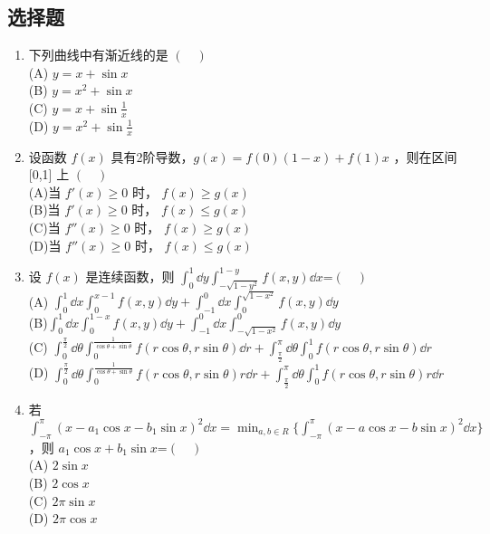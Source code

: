 
\subsection{选择题}
\begin{enumerate}
\item 下列曲线中有渐近线的是 $(\quad)$\\
(A) $y=x+\sin x$\\
(B) $y=x^2+\sin x$\\
(C) $y=x+\sin \frac{1}{x}$\\
(D) $y=x^2+\sin \frac{1}{x}$
\item  设函数 $f(x)$ 具有2阶导数，$g(x)=f(0)(1-x)+f(1)x$  ，则在区间  [0,1] 上 $(\quad)$\\
(A)当 $f'(x) \ge 0$ 时， $f(x)\ge g(x)$\\
(B)当 $f'(x) \ge 0$ 时， $f(x)\le g(x)$\\
(C)当 $f''(x) \ge 0$ 时， $f(x)\ge g(x)$\\
(D)当 $f''(x) \ge 0$ 时， $f(x)\le g(x)$
\item 设 $f(x)$ 是连续函数，则 $\displaystyle \int_0^1 \dd{y}\int_{-\sqrt{1-y^2}}^{1-y}f(x,y)\dd{x}$=$(\quad)$\\
(A) $\displaystyle \int_0^1\dd{x}\int_0^{x-1}f(x,y)\dd{y}+\int_{-1}^0\dd{x}\int_0^{\sqrt{1-x^2}}f(x,y)\dd{y}$\\
(B)$\displaystyle \int_0^1\dd{x}\int_0^{1-x}f(x,y)\dd{y}+\int_{-1}^0\dd{x}\int_{-\sqrt{1-x^2}}^0f(x,y)\dd{y}$\\
(C) $\displaystyle \int_0^{\frac{\pi}{2}}\dd{\theta}\int_0^{\frac{1}{\cos \theta +\sin \theta}}f(r\cos \theta,r\sin \theta)\dd{r}+\int_{\frac{\pi}{2}}^\pi\dd{\theta}\int_0^1 f(r\cos \theta,r\sin \theta)\dd{r}$\\
(D) $\displaystyle \int_0^{\frac{\pi}{2}}\dd{\theta}\int_0^{\frac{1}{\cos \theta +\sin \theta}}f(r\cos \theta,r\sin \theta)r\dd{r}+\int_{\frac{\pi}{2}}^\pi\dd{\theta}\int_0^1 f(r\cos \theta,r\sin \theta)r\dd{r}$\\
\item 若 $\displaystyle \int_{-\pi}^\pi (x-a_1\cos x-b_1\sin x)^2\dd{x}=\min_{a,b \in R}\{\int_{-\pi}^\pi (x-a\cos x-b\sin x)^2\dd{x}\}$ ，则  $a_1\cos x+b_1\sin x$=$(\quad)$\\
(A) $2\sin x $\\
(B) $2\cos x$\\
(C) $2\pi \sin x$\\
(D)  $2\pi \cos x$


\end{enumerate}
